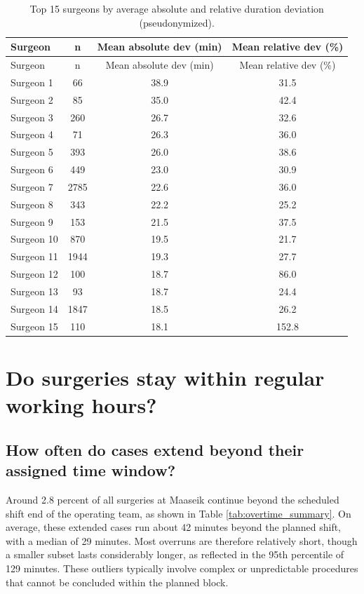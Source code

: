 \documentclass[
]{article}
\begin{document}
\begin{longtable}[]{@{}lccc@{}}
\caption{Top 15 surgeons by average absolute and relative duration
deviation (pseudonymized). \label{tab:surgeon_deviation}}\tabularnewline
\toprule\noalign{}
Surgeon & n & Mean absolute dev (min) & Mean relative dev (\%) \\
\midrule\noalign{}
\endfirsthead
\toprule\noalign{}
Surgeon & n & Mean absolute dev (min) & Mean relative dev (\%) \\
\midrule\noalign{}
\endhead
\bottomrule\noalign{}
\endlastfoot
Surgeon 1 & 66 & 38.9 & 31.5 \\
Surgeon 2 & 85 & 35.0 & 42.4 \\
Surgeon 3 & 260 & 26.7 & 32.6 \\
Surgeon 4 & 71 & 26.3 & 36.0 \\
Surgeon 5 & 393 & 26.0 & 38.6 \\
Surgeon 6 & 449 & 23.0 & 30.9 \\
Surgeon 7 & 2785 & 22.6 & 36.0 \\
Surgeon 8 & 343 & 22.2 & 25.2 \\
Surgeon 9 & 153 & 21.5 & 37.5 \\
Surgeon 10 & 870 & 19.5 & 21.7 \\
Surgeon 11 & 1944 & 19.3 & 27.7 \\
Surgeon 12 & 100 & 18.7 & 86.0 \\
Surgeon 13 & 93 & 18.7 & 24.4 \\
Surgeon 14 & 1847 & 18.5 & 26.2 \\
Surgeon 15 & 110 & 18.1 & 152.8 \\
\end{longtable}

\newpage

\section{Do surgeries stay within regular working
hours?}\label{do-surgeries-stay-within-regular-working-hours}

\subsection{How often do cases extend beyond their assigned time
window?}\label{how-often-do-cases-extend-beyond-their-assigned-time-window}

Around 2.8 percent of all surgeries at Maaseik continue beyond the
scheduled shift end of the operating team, as shown in Table
\ref{tab:overtime_summary}. On average, these extended cases run about
42 minutes beyond the planned shift, with a median of 29 minutes. Most
overruns are therefore relatively short, though a smaller subset lasts
considerably longer, as reflected in the 95th percentile of 129 minutes.
These outliers typically involve complex or unpredictable procedures
that cannot be concluded within the planned block.
\end{document}
